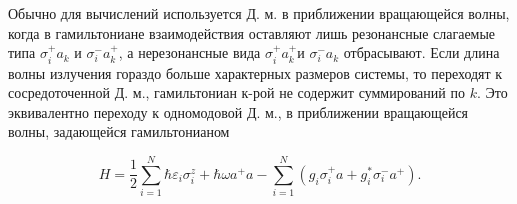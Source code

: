 \documentclass[10pt]{article}
\begin{document}
Обычно для вычислений используется Д. м. в приближении вращающейся волны, когда в гамильтониане взаимодействия оставляют лишь резонансные слагаемые типа $\sigma_{i}^{+} a_{k}$ и $\sigma_{i}^{-} a_{k}^{+}$, а нерезонансные вида $\sigma_{i}^{+} a_{k}^{+}$и $\sigma_{i}^{-} a_{k}$ отбрасывают. Если длина волны излучения гораздо больше характерных размеров системы, то переходят к сосредоточенной Д. м., гамильтониан к-рой не содержит суммирований по $k$. Это эквивалентно переходу к одномодовой Д. м., в приближении вращающейся волны, задающейся гамильтонианом



\[

H=\frac{1}{2} \sum_{i=1}^{N} \hbar \varepsilon_{i} \sigma_{i}^{z}+\hbar \omega a^{+} a-\sum_{i=1}^{N}\left(g_{i} \sigma_{i}^{+} a+g_{i}^{*} \sigma_{i}^{-} a^{+}\right) .

\]
\end{document}
